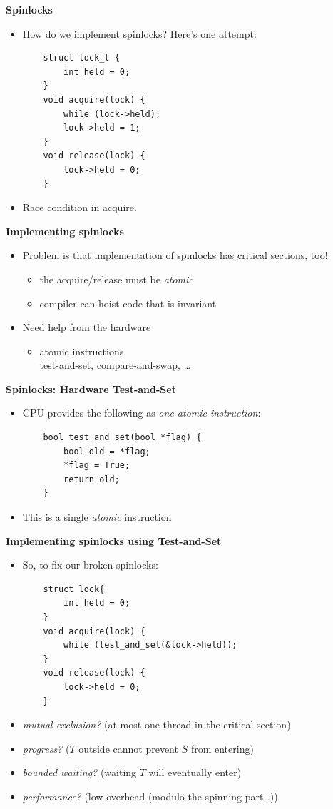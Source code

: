 \documentclass[11pt,a4paper]{article}
\begin{document}
\textbf{Spinlocks}
\begin{itemize}
    \item How do we implement spinlocks?
        Here's one attempt:
        \begin{verbatim}
    struct lock_t {
        int held = 0;
    }
    void acquire(lock) {
        while (lock->held);
        lock->held = 1;
    }
    void release(lock) {
        lock->held = 0;
    }
        \end{verbatim}
    \item Race condition in acquire.
\end{itemize}

\textbf{Implementing spinlocks}
\begin{itemize}
    \item Problem is that implementation of spinlocks has critical sections, too!
        \begin{itemize}
            \item the acquire/release must be \emph{atomic}
            \item compiler can hoist code that is invariant
        \end{itemize}
    \item Need help from the hardware
        \begin{itemize}
            \item atomic instructions \\
                test-and-set, compare-and-swap, \dots
        \end{itemize}
\end{itemize}

\textbf{Spinlocks: Hardware Test-and-Set}
\begin{itemize}
    \item CPU provides the following as \emph{one atomic instruction}:
        \begin{verbatim}
    bool test_and_set(bool *flag) {
        bool old = *flag;
        *flag = True;
        return old;
    }
        \end{verbatim}
    \item This is a single \emph{atomic} instruction
\end{itemize}

\textbf{Implementing spinlocks using Test-and-Set}
\begin{itemize}
    \item So, to fix our broken spinlocks:
        \begin{verbatim}
    struct lock{
        int held = 0;
    }
    void acquire(lock) {
        while (test_and_set(&lock->held));
    }
    void release(lock) {
        lock->held = 0;
    }
        \end{verbatim}
    \item \emph{mutual exclusion?} (at most one thread in the critical section)
    \item \emph{progress?} ($T$ outside cannot prevent $S$ from entering)
    \item \emph{bounded waiting?} (waiting $T$ will eventually enter)
    \item \emph{performance?} (low overhead (modulo the spinning part\dots))
\end{itemize}
\end{document}
